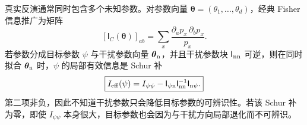 真实反演通常同时包含多个未知参数。对参数向量 $\boldsymbol\theta=(\theta_1,\ldots,\theta_d)$，经典 Fisher 信息推广为矩阵
\begin{equation}
 \boxed{
 [\mathsf I_C(\boldsymbol\theta)]_{ab}
 =\sum_x\frac{\partial_a p_x\,\partial_b p_x}{p_x}.}
 \label{eq:multiparameter-fisher-matrix-dp31}
\end{equation}
若参数分成目标参数 $\psi$ 与干扰参数向量 $\boldsymbol\theta_{\rm n}$，并且干扰参数块 $\mathsf I_{{\rm n}{\rm n}}$ 可逆，则在同时拟合 $\boldsymbol\theta_{\rm n}$ 时，$\psi$ 的局部有效信息是 Schur 补
\begin{equation}
 \boxed{
 I_{\rm eff}(\psi)
 =I_{\psi\psi}
 -\mathsf I_{\psi{\rm n}}
 \mathsf I_{{\rm n}{\rm n}}^{-1}
 \mathsf I_{{\rm n}\psi}.}
 \label{eq:fisher-schur-nuisance-dp31}
\end{equation}
第二项非负，因此不知道干扰参数只会降低目标参数的可辨识性。若该 Schur 补为零，即使 $I_{\psi\psi}$ 本身很大，目标参数也会因为与干扰方向局部退化而不可辨识。

